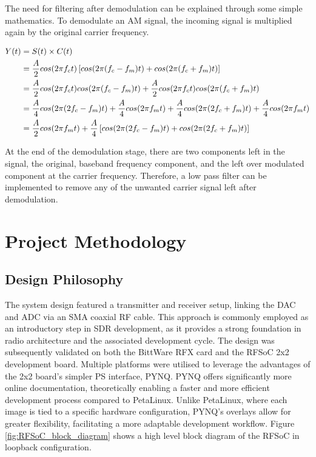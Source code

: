 \documentclass[12pt, a4paper]{article}
\begin{document}
The need for filtering after demodulation can be explained through some simple mathematics. To demodulate an AM signal, the incoming signal is multiplied again by the original carrier frequency.

\begin{align}
    Y(t) &= S(t)\times C(t)\notag\\
    &= \frac{A}{2} cos(2\pi f_c t) \left[cos(2\pi (f_c-f_m)t)+cos(2\pi (f_c+f_m)t)\right]\notag\\
    &= \frac{A}{2}cos(2\pi f_c t)cos(2\pi(f_c-f_m)t)+\frac{A}{2}cos(2\pi f_c t)cos(2\pi(f_c+f_m)t)\notag\\
    &= \frac{A}{4}cos(2\pi(2f_c-f_m)t)+\frac{A}{4}cos(2\pi f_mt)+\frac{A}{4}cos(2\pi(2f_c+f_m)t)+\frac{A}{4}cos(2\pi f_mt)\notag\\
    &= \frac{A}{2}cos(2\pi f_mt) + \frac{A}{4}\left[cos(2\pi(2f_c-f_m)t)+cos(2\pi(2f_c+f_m)t)\right]
    \label{eq:demodulation_maths}
\end{align}


At the end of the demodulation stage, there are two components left in the signal, the original, baseband frequency component, and the left over modulated component at the carrier frequency. Therefore, a low pass filter can be implemented to remove any of the unwanted carrier signal left after demodulation. 


\newpage
\section{Project Methodology}
\subsection{Design Philosophy}
The system design featured a transmitter and receiver setup, linking the DAC and ADC via an SMA coaxial RF cable. This approach is commonly employed as an introductory step in SDR development, as it provides a strong foundation in radio architecture and the associated development cycle. The design was subsequently validated on both the BittWare RFX card and the RFSoC 2x2 development board. Multiple platforms were utilised to leverage the advantages of the 2x2 board’s simpler PS interface, PYNQ. PYNQ offers significantly more online documentation, theoretically enabling a faster and more efficient development process compared to PetaLinux. Unlike PetaLinux, where each image is tied to a specific hardware configuration, PYNQ’s overlays allow for greater flexibility, facilitating a more adaptable development workflow. Figure \ref{fig:RFSoC_block_diagram} shows a high level block diagram of the RFSoC in loopback configuration.
\end{document}
